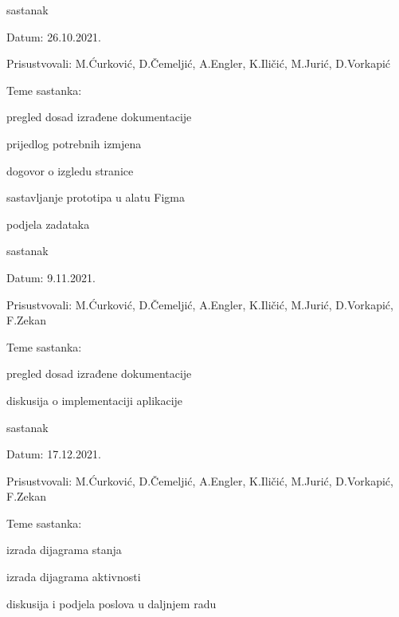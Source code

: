 \begin{packed_enum}
	\item  sastanak
	\item[] \begin{packed_item}
		\item Datum: 26.10.2021.
		\item Prisustvovali: M.Ćurković, D.Čemeljić, A.Engler, K.Iličić, M.Jurić, D.Vorkapić
		\item Teme sastanka:
		\begin{packed_item}
			\item  pregled dosad izrađene dokumentacije
			\item  prijedlog potrebnih izmjena
			\item  dogovor o izgledu stranice
			\item  sastavljanje prototipa u alatu Figma
			\item  podjela zadataka
		\end{packed_item}
	\end{packed_item}
	
	
	
	\item  sastanak
	\item[] \begin{packed_item}
		\item Datum: 9.11.2021.
		\item Prisustvovali: M.Ćurković, D.Čemeljić, A.Engler, K.Iličić, M.Jurić, D.Vorkapić, F.Zekan
		\item Teme sastanka:
		\begin{packed_item}
			\item  pregled dosad izrađene dokumentacije
			\item  diskusija o implementaciji aplikacije
		\end{packed_item}
	\end{packed_item}
	
	
	
	\item  sastanak
	\item[] \begin{packed_item}
		\item Datum: 17.12.2021.
		\item Prisustvovali: M.Ćurković, D.Čemeljić, A.Engler, K.Iličić, M.Jurić, D.Vorkapić, F.Zekan
		\item Teme sastanka:
		\begin{packed_item}
			\item  izrada dijagrama stanja
			\item  izrada dijagrama aktivnosti
			\item  diskusija i podjela poslova u daljnjem radu
		\end{packed_item}
	\end{packed_item}
	

\end{packed_enum}
